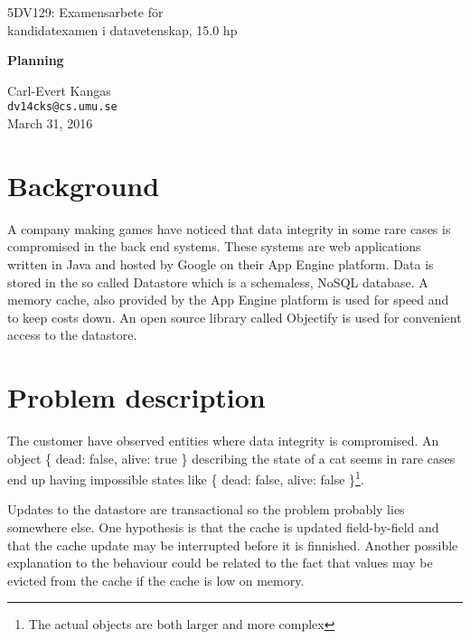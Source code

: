 \documentclass[10pt, titlepage, oneside, a4paper]{article}
\begin{document}
\begin{center}
\begin{large}
  5DV129: Examensarbete för\\ kandidatexamen i datavetenskap, 15.0 hp
  
\vspace{8mm}
\begin{LARGE}\textbf{Planning}\end{LARGE}
\vspace{6mm}

\end{large}

Carl-Evert Kangas\\\texttt{dv14cks@cs.umu.se}\\March 31, 2016
\vspace{3mm}

\end{center} 

\section*{Background}
 
A company making games have noticed that data integrity in some rare
cases is compromised in the back end systems. These systems are web
applications written in Java and hosted by Google on their App Engine
platform. Data is stored in the so called Datastore which is a
schemaless, NoSQL database. A memory cache, also provided by the App
Engine platform is used for speed and to keep costs down. An open
source library called Objectify is used for convenient access to the datastore.

\section*{Problem description}

The customer have observed entities where data integrity is
compromised. An object \{ dead: false, alive: true \} describing the
state of a cat seems in rare cases end up having impossible states
like \{ dead: false, alive: false \}\footnote{The actual objects are
  both larger and more complex}.

Updates to the datastore are transactional so the problem probably
lies somewhere else. One hypothesis is that the cache is updated
field-by-field and that the cache update may be interrupted before it
is finnished. Another possible explanation to the behaviour could be
related to the fact that values may be evicted from the cache if the
cache is low on memory.
\end{document}
